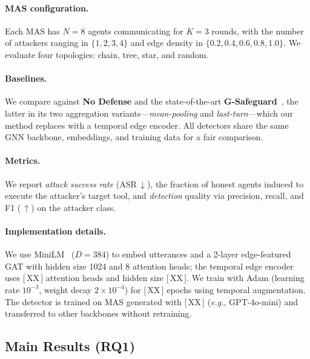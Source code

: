 \paragraph{MAS configuration.}
Each MAS has $N{=}8$ agents communicating for $K{=}3$ rounds, with the number of
attackers ranging in $\{1,2,3,4\}$ and edge density in
$\{0.2,0.4,0.6,0.8,1.0\}$. We evaluate four topologies: chain, tree, star, and
random.

\paragraph{Baselines.}
We compare against \textbf{No Defense} and the state-of-the-art
\textbf{G-Safeguard}~\citep{wang2025gsafeguard}, the latter in its two aggregation
variants---\emph{mean-pooling} and \emph{last-turn}---which our method replaces
with a temporal edge encoder. All detectors share the same GNN backbone,
embeddings, and training data for a fair comparison.

\paragraph{Metrics.}
We report \emph{attack success rate} (ASR\,$\downarrow$), the fraction of honest
agents induced to execute the attacker's target tool, and \emph{detection}
quality via precision, recall, and F1 (\,$\uparrow$) on the attacker class.

\paragraph{Implementation details.}
We use MiniLM~\citep{wang2020minilm} ($D{=}384$) to embed utterances and
a 2-layer edge-featured GAT with hidden size 1024 and 8 attention heads; the
temporal edge encoder uses [\,XX\,] attention heads and hidden size [\,XX\,]. We
train with Adam (learning rate $10^{-3}$, weight decay $2{\times}10^{-4}$) for
[\,XX\,] epochs using temporal augmentation. The detector is trained on MAS
generated with [\,XX\,] (\emph{e.g.}, GPT-4o-mini) and transferred to other
backbones without retraining.

\subsection{Main Results (RQ1)}
\label{sec:exp_main}

